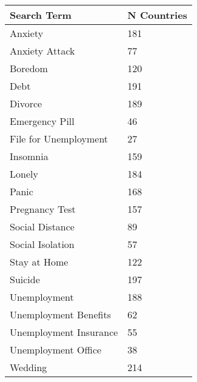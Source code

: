 \begin{tabular}{ll} \hline Search Term & N Countries \\ 
\hline Anxiety  &  181  \\ 
Anxiety Attack  &  77  \\ 
Boredom  &  120  \\ 
Debt  &  191  \\ 
Divorce  &  189  \\ 
Emergency Pill  &  46  \\ 
File for Unemployment  &  27  \\ 
Insomnia  &  159  \\ 
Lonely  &  184  \\ 
Panic  &  168  \\ 
Pregnancy Test  &  157  \\ 
Social Distance  &  89  \\ 
Social Isolation  &  57  \\ 
Stay at Home  &  122  \\ 
Suicide  &  197  \\ 
Unemployment  &  188  \\ 
Unemployment Benefits  &  62  \\ 
Unemployment Insurance  &  55  \\ 
Unemployment Office  &  38  \\ 
Wedding  &  214  \\ 
\hline \end{tabular} 